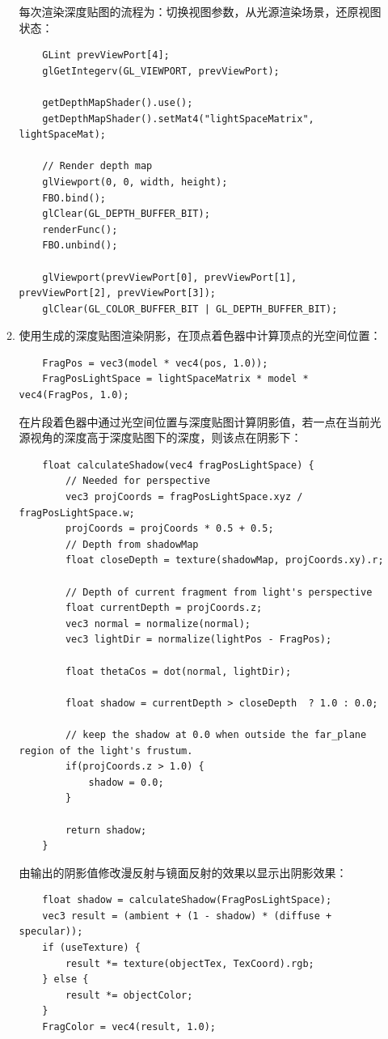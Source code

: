 \documentclass[12pt]{article}
\begin{document}
\begin{enumerate}
\begin{enumerate}
        每次渲染深度贴图的流程为：切换视图参数，从光源渲染场景，还原视图状态：
        \begin{lstlisting}
    GLint prevViewPort[4];
    glGetIntegerv(GL_VIEWPORT, prevViewPort);

    getDepthMapShader().use();
    getDepthMapShader().setMat4("lightSpaceMatrix", lightSpaceMat);

    // Render depth map
    glViewport(0, 0, width, height);
    FBO.bind();
    glClear(GL_DEPTH_BUFFER_BIT);
    renderFunc();
    FBO.unbind();

    glViewport(prevViewPort[0], prevViewPort[1], prevViewPort[2], prevViewPort[3]);
    glClear(GL_COLOR_BUFFER_BIT | GL_DEPTH_BUFFER_BIT);
        \end{lstlisting}


        \item 使用生成的深度贴图渲染阴影，在顶点着色器中计算顶点的光空间位置：
        \begin{lstlisting}
    FragPos = vec3(model * vec4(pos, 1.0));
    FragPosLightSpace = lightSpaceMatrix * model * vec4(FragPos, 1.0);
        \end{lstlisting}
        在片段着色器中通过光空间位置与深度贴图计算阴影值，若一点在当前光源视角的深度高于深度贴图下的深度，则该点在阴影下：
        \begin{lstlisting}
    float calculateShadow(vec4 fragPosLightSpace) {
        // Needed for perspective
        vec3 projCoords = fragPosLightSpace.xyz / fragPosLightSpace.w;
        projCoords = projCoords * 0.5 + 0.5;
        // Depth from shadowMap
        float closeDepth = texture(shadowMap, projCoords.xy).r;

        // Depth of current fragment from light's perspective
        float currentDepth = projCoords.z;
        vec3 normal = normalize(normal);
        vec3 lightDir = normalize(lightPos - FragPos);

        float thetaCos = dot(normal, lightDir);

        float shadow = currentDepth > closeDepth  ? 1.0 : 0.0;

        // keep the shadow at 0.0 when outside the far_plane region of the light's frustum.
        if(projCoords.z > 1.0) {
            shadow = 0.0;
        }

        return shadow;
    }
        \end{lstlisting}
        由输出的阴影值修改漫反射与镜面反射的效果以显示出阴影效果：
        \begin{lstlisting}
    float shadow = calculateShadow(FragPosLightSpace);
    vec3 result = (ambient + (1 - shadow) * (diffuse + specular));
    if (useTexture) {
        result *= texture(objectTex, TexCoord).rgb;
    } else {
        result *= objectColor;
    }
    FragColor = vec4(result, 1.0);
        \end{lstlisting}


\end{enumerate}
\end{enumerate}
\end{document}
